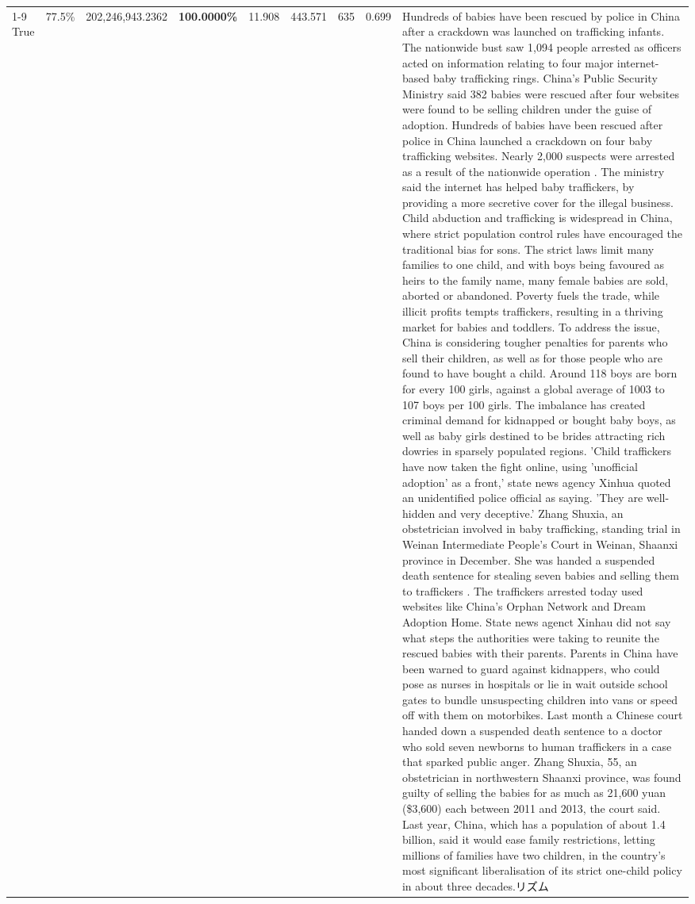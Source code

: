 \begin{table}[H]
\begin{tabular}{lllrlllll}
\cline{1-9}
True & 77.5\% & 202,246,943.2362 & \bfseries \color{red} 100.0000\% & 11.908 & 443.571 & 635 & 0.699 & Hundreds of babies have been rescued by police in China after a crackdown was launched on trafficking infants. The nationwide bust saw 1,094 people arrested as officers acted on information relating to four major internet-based baby trafficking rings. China's Public Security Ministry said 382 babies were rescued after four websites were found to be selling children under the guise of adoption. Hundreds of babies have been rescued after police in China launched a crackdown on four baby trafficking websites. Nearly 2,000 suspects were arrested as a result of the nationwide operation . The ministry said the internet has helped baby traffickers, by providing a more secretive cover for the illegal business. Child abduction and trafficking is widespread in China, where strict population control rules have encouraged the traditional bias for sons. The strict laws limit many families to one child, and with boys being favoured as heirs to the family name, many female babies are sold, aborted or abandoned. Poverty fuels the trade, while illicit profits tempts traffickers, resulting in a thriving market for babies and toddlers. To address the issue, China is considering tougher penalties for parents who sell their children, as well as for those people who are found to have bought a child. Around 118 boys are born for every 100 girls, against a global average of 1003 to 107 boys per 100 girls. The imbalance has created criminal demand for kidnapped or bought baby boys, as well as baby girls destined to be brides attracting rich dowries in sparsely populated regions. 'Child traffickers have now taken the fight online, using 'unofficial adoption' as a front,' state news agency Xinhua quoted an unidentified police official as saying. 'They are well-hidden and very deceptive.' Zhang Shuxia, an obstetrician involved in baby trafficking, standing trial in Weinan Intermediate People's Court in Weinan, Shaanxi province in December. She was handed a suspended death sentence for stealing seven babies and selling them to traffickers . The traffickers arrested today used websites like China's Orphan Network and Dream Adoption Home. State news agenct Xinhau did not say what steps the authorities were taking to reunite the rescued babies with their parents. Parents in China have been warned to guard against kidnappers, who could pose as nurses in hospitals or lie in wait outside school gates to bundle unsuspecting children into vans or speed off with them on motorbikes. Last month a Chinese court handed down a suspended death sentence to a doctor who sold seven newborns to human traffickers in a case that sparked public anger. Zhang Shuxia, 55, an obstetrician in northwestern Shaanxi province, was found guilty of selling the babies for as much as 21,600 yuan (\$3,600) each between 2011 and 2013, the court said. Last year, China, which has a population of about 1.4 billion, said it would ease family restrictions, letting millions of families have two children, in the country's most significant liberalisation of its strict one-child policy in about three decades.リズム \\

\end{tabular}
\end{table}

